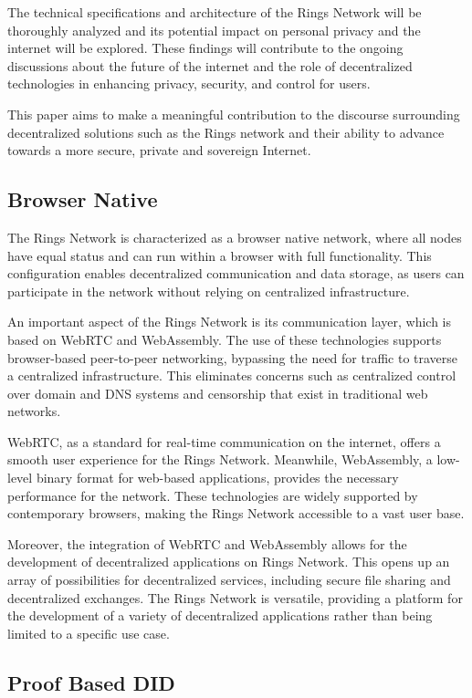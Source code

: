 \documentclass[twocolumn]{article}
\begin{document}
The technical specifications and architecture of the Rings Network will be thoroughly analyzed and its potential impact on personal privacy and the internet will be explored. These findings will contribute to the ongoing discussions about the future of the internet and the role of decentralized technologies in enhancing privacy, security, and control for users.

This paper aims to make a meaningful contribution to the discourse surrounding decentralized solutions such as the Rings network and their ability to advance towards a more secure, private and sovereign Internet.

\subsection{Browser Native}

The Rings Network is characterized as a browser native network, where all nodes have equal status and can run within a browser with full functionality. This configuration enables decentralized communication and data storage, as users can participate in the network without relying on centralized infrastructure.


An important aspect of the Rings Network is its communication layer, which is based on WebRTC\cite{webrtc-standard} and WebAssembly\cite{webassembly}. The use of these technologies supports browser-based peer-to-peer networking, bypassing the need for traffic to traverse a centralized infrastructure. This eliminates concerns such as centralized control over domain and DNS systems and censorship that exist in traditional web networks.


WebRTC, as a standard for real-time communication on the internet, offers a smooth user experience for the Rings Network. Meanwhile, WebAssembly, a low-level binary format for web-based applications, provides the necessary performance for the network. These technologies are widely supported by contemporary browsers, making the Rings Network accessible to a vast user base.

Moreover, the integration of WebRTC and WebAssembly allows for the development of decentralized applications on Rings Network. This opens up an array of possibilities for decentralized services, including secure file sharing and decentralized exchanges. The Rings Network is versatile, providing a platform for the development of a variety of decentralized applications rather than being limited to a specific use case.

\subsection{Proof Based DID}
\end{document}
